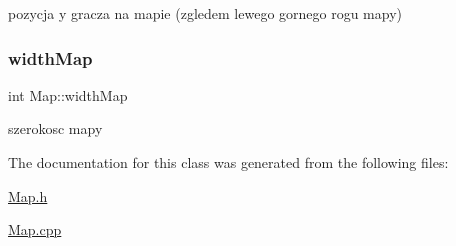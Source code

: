 pozycja y gracza na mapie (zgledem lewego gornego rogu mapy) \mbox{\label{class_map_ac62ec077cb012a9fe7d987b466a48947}} 
\subsubsection{\texorpdfstring{width\+Map}{widthMap}}
{\footnotesize\ttfamily int Map\+::width\+Map}

szerokosc mapy 

The documentation for this class was generated from the following files\+:\begin{DoxyCompactItemize}
\item 
\hyperlink{_map_8h}{Map.\+h}\item 
\hyperlink{_map_8cpp}{Map.\+cpp}\end{DoxyCompactItemize}
